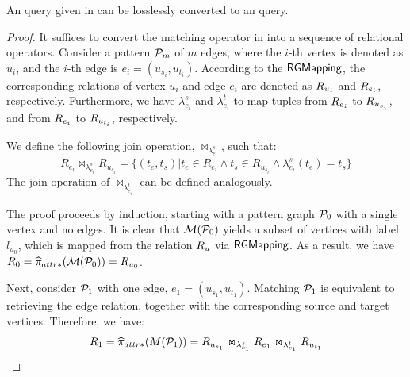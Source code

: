 \begin{lemma}
    \label{lem:spjm-to-spj}
    An \spjm query given in  can be losslessly converted to an \spj query.
\end{lemma}
\begin{proof}
    It suffices to convert the matching operator in  into a sequence of relational operators. Consider a pattern $\mathcal{P}_m$ of $m$ edges, where the $i$-th vertex is denoted as $u_i$, and the $i$-th edge is $e_i = (u_{s_i}, u_{t_i})$. According to the ${\mathsf{RGMapping}}$, the corresponding relations of vertex $u_i$ and edge $e_i$ are denoted as ${R_{u_i}}$ and ${R_{e_i}}$, respectively. Furthermore, we have $\lambda_{e_i}^s$ and $\lambda_{e_i}^t$ to map tuples from ${R_{e_i}}$ to ${R_{u_{s_i}}}$, and from ${R_{e_i}}$ to ${R_{u_{t_i}}}$, respectively.

We define the following join operation, $\Join_{\lambda_{e_i}^s}$, such that:
\[ R_{e_i} \Join_{\lambda_{e_i}^s} R_{u_{s_i}} = \{(t_e, t_s) | t_e \in R_{e_i} \land t_s \in R_{u_{s_i}} \land \lambda_{e_i}^s(t_e) = t_s\} \]
The join operation of $\Join_{\lambda_{e_i}^t}$ can be defined analogously.

The proof proceeds by induction, starting with a pattern graph $\mathcal{P}_0$ with a single vertex and no edges. It is clear that $\mathcal{M}(\mathcal{P}_0)$ yields a subset of vertices with label $l_{u_0}$, which is mapped from the relation ${R_{u}}$ via ${\mathsf{RGMapping}}$. As a result, we have $R_0 = \widehat{\pi}_{attr*}(\mathcal{M}(\mathcal{P}_0)) = {R_{u_0}}$.

Next, consider $\mathcal{P}_1$ with one edge, $e_1 = (u_{s_1}, u_{t_1})$. Matching $\mathcal{P}_1$ is equivalent to retrieving the edge relation, together with the corresponding source and target vertices. Therefore, we have:
\[ R_1 = \widehat{\pi}_{attr*}(M(\mathcal{P}_1)) = {R_{u_{s_1}}} \Join_{\lambda_{e_1}^s} {R_{e_1}} \Join_{\lambda_{e_1}^t} {R_{u_{t_1}}} \]


\end{proof}
